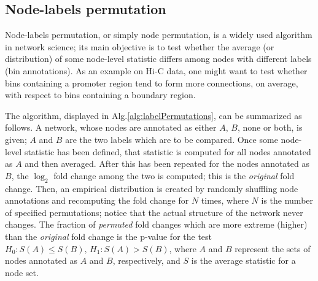 \subsection{Node-labels permutation}

Node-labels permutation, or simply node permutation, is a widely used algorithm in network science; its main objective is to test whether the average (or distribution) of some node-level statistic differs among nodes with different labels (bin annotations). As an example on Hi-C data, one might want to test whether bins containing a promoter region tend to form more connections, on average, with respect to bins containing a boundary region. 

The algorithm, displayed in Alg.\ref{alg:labelPermutations}, can be summarized as follows. A network, whose nodes are annotated as either $A$, $B$, none or both, is given; $A$ and $B$ are the two labels which are to be compared. Once some node-level statistic has been defined, that statistic is computed for all nodes annotated as $A$ and then averaged. After this has been repeated for the nodes annotated as $B$, the $\log_2$ fold change among the two is computed; this is the \emph{original} fold change. Then, an empirical distribution is created by randomly shuffling node annotations and recomputing the fold change for $N$ times, where $N$ is the number of specified permutations; notice that the actual structure of the network never changes. The fraction of \emph{permuted} fold changes which are more extreme (higher) than the \emph{original} fold change is the p-value for the test $H_0: S(A) \leq S(B), \, H_1: S(A) > S(B)$, where $A$ and $B$ represent the sets of nodes annotated as $A$ and $B$, respectively, and $S$ is the average statistic for a node set. 

